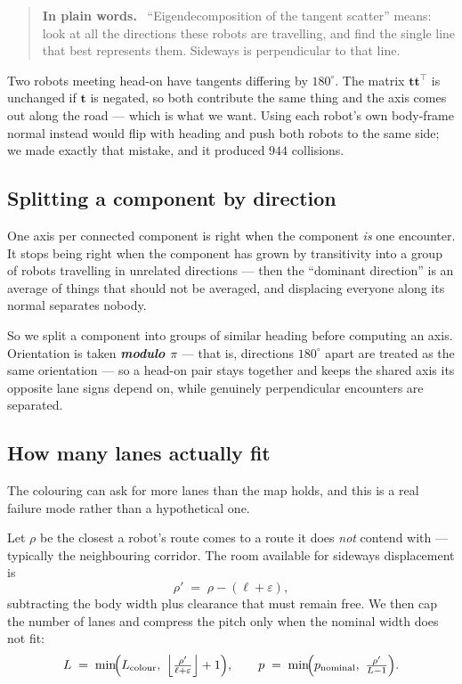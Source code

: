 \documentclass[11pt,a4paper]{article}
\newcommand{\defn}[1]{\textbf{\textit{#1}}}
\newenvironment{keypoint}
  {\begin{quote}\small\noindent\textbf{In plain words.}\ }
  {\end{quote}}
\begin{document}
\begin{keypoint}
``Eigendecomposition of the tangent scatter'' means: look at all the directions these robots
are travelling, and find the single line that best represents them. Sideways is
perpendicular to that line.
\end{keypoint}

Two robots meeting head-on have tangents differing by $180^\circ$. The matrix
$\mathbf{t}\mathbf{t}^{\!\top}$ is unchanged if $\mathbf{t}$ is negated, so both contribute
the same thing and the axis comes out along the road --- which is what we want. Using each
robot's own body-frame normal instead would flip with heading and push both robots to the
same side; we made exactly that mistake, and it produced $944$ collisions.

\subsection{Splitting a component by direction}

One axis per connected component is right when the component \emph{is} one encounter. It
stops being right when the component has grown by transitivity into a group of robots
travelling in unrelated directions --- then the ``dominant direction'' is an average of
things that should not be averaged, and displacing everyone along its normal separates
nobody.

So we split a component into groups of similar heading before computing an axis. Orientation
is taken \defn{modulo $\pi$} --- that is, directions $180^\circ$ apart are treated as the
same orientation --- so a head-on pair stays together and keeps the shared axis its opposite
lane signs depend on, while genuinely perpendicular encounters are separated.

\subsection{How many lanes actually fit}

The colouring can ask for more lanes than the map holds, and this is a real failure mode
rather than a hypothetical one.

Let $\rho$ be the closest a robot's route comes to a route it does \emph{not} contend with
--- typically the neighbouring corridor. The room available for sideways displacement is
\[
\rho' \;=\; \rho - (\ell + \varepsilon),
\]
subtracting the body width plus clearance that must remain free. We then cap the number of
lanes and compress the pitch only when the nominal width does not fit:
\[
L \;=\; \min\!\Bigl(L_{\mathrm{colour}},\ \Bigl\lfloor \tfrac{\rho'}{\ell + \varepsilon} \Bigr\rfloor + 1 \Bigr),
\qquad
p \;=\; \min\!\Bigl(p_{\mathrm{nominal}},\ \tfrac{\rho'}{L-1}\Bigr).
\]
\end{document}
